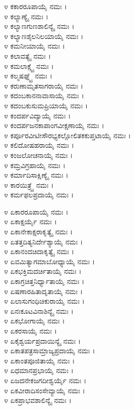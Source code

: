 ೪ ಕಕಾರರೂಪಾಯೈ ನಮಃ ।\\
೪ ಕಲ್ಯಾಣ್ಯೈ ನಮಃ ।\\
೪ ಕಲ್ಯಾಣಗುಣಶಾಲಿನ್ಯೈ ನಮಃ ।\\
೪ ಕಲ್ಯಾಣಶೈಲನಿಲಯಾಯೈ ನಮಃ ।\\
೪ ಕಮನೀಯಾಯೈ ನಮಃ ।\\
೪ ಕಲಾವತ್ಯೈ ನಮಃ ।\\
೪ ಕಮಲಾಕ್ಷ್ಯೈ ನಮಃ ।\\
೪ ಕಲ್ಮಷಘ್ನ್ಯೈ ನಮಃ ।\\
೪ ಕರುಣಾಮೃತಸಾಗರಾಯೈ ನಮಃ ।\\
೪ ಕದಂಬಕಾನನಾವಾಸಾಯೈ ನಮಃ ।\\
೪ ಕದಂಬಕುಸುಮಪ್ರಿಯಾಯೈ ನಮಃ ।\\
೪ ಕಂದರ್ಪವಿದ್ಯಾಯೈ ನಮಃ ।\\
೪ ಕಂದರ್ಪಜನಕಾಪಾಂಗವೀಕ್ಷಣಾಯೈ ನಮಃ ।\\
೪ ಕರ್ಪೂರವೀಟೀಸೌರಭ್ಯಕಲ್ಲೋಲಿತಕಕುಪ್ತಟಾಯೈ ನಮಃ ।\\
೪ ಕಲಿದೋಷಹರಾಯೈ ನಮಃ ।\\
೪ ಕಂಜಲೋಚನಾಯೈ ನಮಃ ।\\
೪ ಕಮ್ರವಿಗ್ರಹಾಯೈ ನಮಃ ।\\
೪ ಕರ್ಮಾದಿಸಾಕ್ಷಿಣ್ಯೈ ನಮಃ ।\\
೪ ಕಾರಯಿತ್ರ್ಯೈ ನಮಃ ।\\
೪ ಕರ್ಮಫಲಪ್ರದಾಯೈ ನಮಃ ।


೪ ಏಕಾರರೂಪಾಯೈ ನಮಃ ।\\
೪ ಏಕಾಕ್ಷರ್ಯೈ ನಮಃ ।\\
೪ ಏಕಾನೇಕಾಕ್ಷರಾಕೃತ್ಯೈ ನಮಃ ।\\
೪ ಏತತ್ತದಿತ್ಯನಿರ್ದೇಶ್ಯಾಯೈ ನಮಃ ।\\
೪ ಏಕಾನಂದಚಿದಾಕೃತ್ಯೈ ನಮಃ ।\\
೪ ಏವಮಿತ್ಯಾಗಮಾಬೋಧ್ಯಾಯೈ ನಮಃ ।\\
೪ ಏಕಭಕ್ತಿಮದರ್ಚಿತಾಯೈ ನಮಃ ।\\
೪ ಏಕಾಗ್ರಚಿತ್ತನಿರ್ಧ್ಯಾತಾಯೈ ನಮಃ ।\\
೪ ಏಷಣಾರಹಿತಾದೃತಾಯೈ ನಮಃ ।\\
೪ ಏಲಾಸುಗಂಧಿಚಿಕುರಾಯೈ ನಮಃ ।\\
೪ ಏನಃಕೂಟವಿನಾಶಿನ್ಯೈ ನಮಃ ।\\
೪ ಏಕಭೋಗಾಯೈ ನಮಃ ।\\
೪ ಏಕರಸಾಯೈ ನಮಃ ।\\
೪ ಏಕೈಶ್ವರ್ಯಪ್ರದಾಯಿನ್ಯೈ ನಮಃ ।\\
೪ ಏಕಾತಪತ್ರಸಾಮ್ರಾಜ್ಯಪ್ರದಾಯೈ ನಮಃ ।\\
೪ ಏಕಾಂತಪೂಜಿತಾಯೈ ನಮಃ ।\\
೪ ಏಧಮಾನಪ್ರಭಾಯೈ ನಮಃ ।\\
೪ ಏಜದನೇಕಜಗದೀಶ್ವರ್ಯೈ ನಮಃ ।\\
೪ ಏಕವೀರಾದಿಸಂಸೇವ್ಯಾಯೈ ನಮಃ ।\\
೪ ಏಕಪ್ರಾಭವಶಾಲಿನ್ಯೈ ನಮಃ ।


